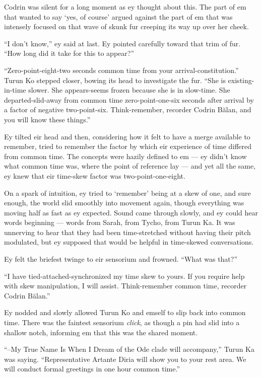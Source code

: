 Codrin was silent for a long moment as ey thought about this. The part of em that wanted to say `yes, of course' argued against the part of em that was intensely focused on that wave of skunk fur creeping its way up over her cheek.

``I don't know,'' ey said at last. Ey pointed carefully toward that trim of fur. ``How long did it take for this to appear?''

``Zero-point-eight-two seconds common time from your arrival-constitution.'' Turun Ko stepped closer, bowing its head to investigate the fur. ``She is existing-in-time slower. She appears-seems frozen because she is in slow-time. She departed-slid-away from common time zero-point-one-six seconds after arrival by a factor of negative two-point-six. Think-remember, recorder Codrin Bălan, and you will know these things.''

Ey tilted eir head and then, considering how it felt to have a merge available to remember, tried to remember the factor by which eir experience of time differed from common time. The concepts were hazily defined to em — ey didn't know what common time was, where the point of reference lay — and yet all the same, ey knew that eir time-skew factor was two-point-one-eight.

On a spark of intuition, ey tried to `remember' being at a skew of one, and sure enough, the world slid smoothly into movement again, though everything was moving half as fast as ey expected. Sound came through slowly, and ey could hear words beginning — words from Sarah, from Tycho, from Turun Ka. It was unnerving to hear that they had been time-stretched without having their pitch modulated, but ey supposed that would be helpful in time-skewed conversations.

Ey felt the briefest twinge to eir sensorium and frowned. ``What was that?''

``I have tied-attached-synchronized my time skew to yours. If you require help with skew manipulation, I will assist. Think-remember common time, recorder Codrin Bălan.''

Ey nodded and slowly allowed Turun Ko and emself to slip back into common time. There was the faintest sensorium \emph{click}, as though a pin had slid into a shallow notch, informing em that this was the shared moment.

``--My True Name Is When I Dream of the Ode clade will accompany,'' Turun Ka was saying. ``Representative Artante Diria will show you to your rest area. We will conduct formal greetings in one hour common time.''


